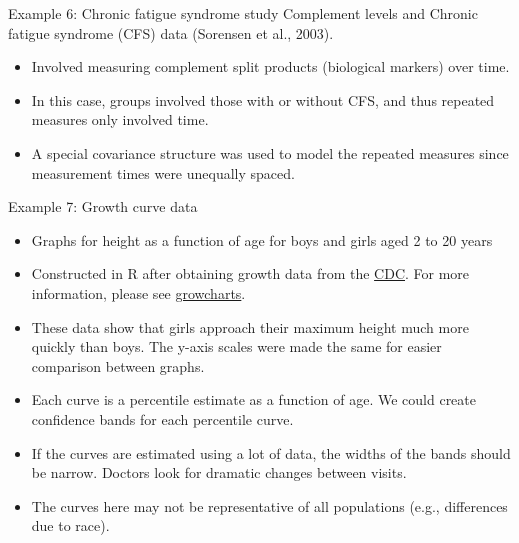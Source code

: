 \documentclass[
  9pt,
  ignorenonframetext,
]{beamer}
\begin{document}
\begin{frame}{}
\protect\hypertarget{section-5}{}
\begin{block}{Example 6: Chronic fatigue syndrome study}
\protect\hypertarget{example-6-chronic-fatigue-syndrome-study}{}
Complement levels and Chronic fatigue syndrome (CFS) data (Sorensen et
al., 2003).

\begin{itemize}
\item
  Involved measuring complement split products (biological markers) over
  time.
\item
  In this case, groups involved those with or without CFS, and thus
  repeated measures only involved time.
\item
  A special covariance structure was used to model the repeated measures
  since measurement times were unequally spaced.
\end{itemize}
\end{block}
\end{frame}

\begin{frame}{}
\protect\hypertarget{section-6}{}
\begin{block}{Example 7: Growth curve data}
\protect\hypertarget{example-7-growth-curve-data}{}
\begin{itemize}
\item
  Graphs for height as a function of age for boys and girls aged 2 to 20
  years
\item
  Constructed in R after obtaining growth data from the
  \href{http://www.cdc.gov/}{CDC}. For more information, please see
  \href{http://www.cdc.gov/growthcharts/}{growcharts}.
\item
  These data show that girls approach their maximum height much more
  quickly than boys. The y-axis scales were made the same for easier
  comparison between graphs.
\item
  Each curve is a percentile estimate as a function of age. We could
  create confidence bands for each percentile curve.
\item
  If the curves are estimated using a lot of data, the widths of the
  bands should be narrow. Doctors look for dramatic changes between
  visits.
\item
  The curves here may not be representative of all populations (e.g.,
  differences due to race).
\end{itemize}
\end{block}
\end{frame}
\end{document}
